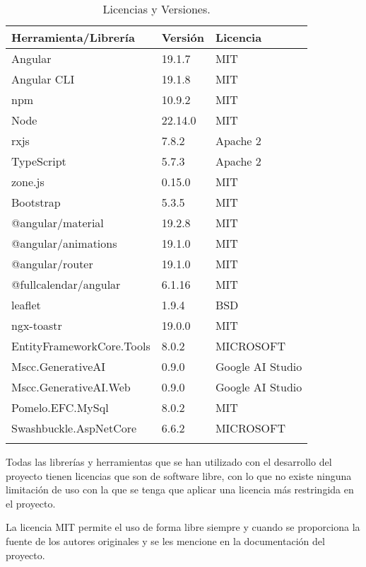 \begin{longtable}{@{} p{5cm} p{3cm} p{5cm} @{}}
  \toprule
  \rowcolor{gray!20}
  Herramienta/Librería & Versión & Licencia \\ 
  \midrule
  \endhead
  
  Angular  & 19.1.7 & MIT \\ 
  \midrule
  
  Angular CLI  & 19.1.8 & MIT \\ 
  \midrule

  npm  & 10.9.2 & MIT \\
  \midrule

  Node  & 22.14.0 & MIT \\
  \midrule

  rxjs  & 7.8.2 & Apache 2 \\
  \midrule

  TypeScript  & 5.7.3 & Apache 2 \\
  \midrule

  zone.js  & 0.15.0 & MIT \\
  \midrule

  Bootstrap  & 5.3.5 & MIT \\
  \midrule

  @angular/material  & 19.2.8 & MIT \\
  \midrule

  @angular/animations  & 19.1.0 & MIT \\
  \midrule

  @angular/router  & 19.1.0 & MIT \\
  \midrule

  @fullcalendar/angular  & 6.1.16 & MIT \\
  \midrule

  leaflet  & 1.9.4 & BSD \\
  \midrule

  ngx-toastr  & 19.0.0 & MIT \\
  \midrule

  EntityFrameworkCore.Tools  & 8.0.2 & MICROSOFT \\
  \midrule

  Mscc.GenerativeAI  & 0.9.0 & Google AI Studio \\
  \midrule

  Mscc.GenerativeAI.Web  & 0.9.0 & Google AI Studio \\
  \midrule

  Pomelo.EFC.MySql  & 8.0.2 & MIT \\
  \midrule

  Swashbuckle.AspNetCore  & 6.6.2 & MICROSOFT \\
  \midrule
  
  \bottomrule
  \caption{Licencias y Versiones.}
\end{longtable}

Todas las librerías y herramientas que se han utilizado con el desarrollo del proyecto tienen licencias que son de software libre, con lo que no existe ninguna limitación de uso con la que se tenga que aplicar una licencia más restringida en el proyecto.

La licencia MIT permite el uso de forma libre siempre y cuando se proporciona la fuente de los autores originales y se les mencione en la documentación del proyecto.
